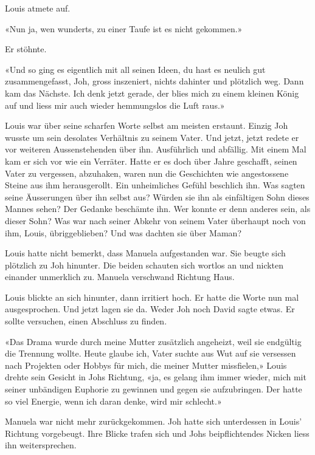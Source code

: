 Louis atmete auf.

«Nun ja, wen wunderts, zu einer Taufe ist es nicht gekommen.»

Er stöhnte.

«Und so ging es eigentlich mit all seinen Ideen, du hast es neulich gut
zusammengefasst, Joh, gross inszeniert, nichts dahinter und plötzlich
weg. Dann kam das Nächste. Ich denk jetzt gerade, der blies mich zu einem kleinen König auf und liess mir
auch wieder hemmungslos die Luft raus.»

Louis war über seine scharfen Worte selbst am meisten erstaunt. Einzig
Joh wusste um sein desolates Verhältnis zu seinem Vater. Und jetzt,
jetzt redete er vor weiteren Aussenstehenden über ihn. Ausführlich und
abfällig. Mit einem Mal kam er sich vor wie ein Verräter. Hatte er es doch
über Jahre geschafft, seinen Vater zu vergessen, abzuhaken, waren nun
die Geschichten wie angestossene Steine aus ihm herausgerollt.
Ein unheimliches Gefühl beschlich ihn. Was sagten seine Äusserungen über
ihn selbst aus? Würden sie ihn als einfältigen Sohn dieses Mannes sehen?
Der Gedanke beschämte ihn. Wer konnte er denn anderes sein, als dieser Sohn?
Was war nach seiner Abkehr von seinem Vater überhaupt noch von ihm, Louis, 
übriggeblieben? Und was dachten sie über Maman?

\sectionbreak

Louis hatte nicht bemerkt, dass Manuela aufgestanden war. Sie beugte sich  
plötzlich zu Joh hinunter. Die beiden schauten sich wortlos an und nickten
einander unmerklich zu. Manuela verschwand Richtung Haus. 

Louis blickte an sich hinunter, dann irritiert hoch. Er hatte die Worte nun mal ausgesprochen. Und jetzt lagen sie da. Weder Joh noch David sagte etwas. Er sollte versuchen, einen Abschluss zu finden.

«Das Drama wurde durch meine Mutter zusätzlich angeheizt, weil sie
endgültig die Trennung wollte. Heute glaube ich, Vater suchte aus Wut
auf sie versessen nach Projekten oder Hobbys für mich, die meiner
Mutter missfielen,» Louis drehte sein Gesicht in Johs Richtung, «ja, es gelang ihm immer wieder,
mich mit seiner unbändigen Euphorie zu gewinnen und gegen sie
aufzubringen. Der hatte so viel Energie, wenn ich daran denke, wird mir
schlecht.»

Manuela war nicht mehr zurückgekommen. Joh hatte sich unterdessen in Louis’ Richtung vorgebeugt. Ihre Blicke
trafen sich und Johs beipflichtendes Nicken liess ihn weitersprechen. 

